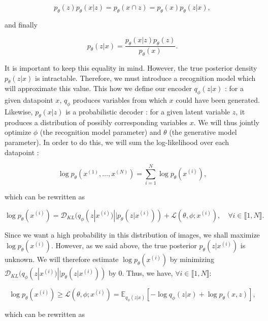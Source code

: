 \documentclass{article}
\begin{document}
\begin{center}
        \[p_\theta(z)p_\theta(x|z) = p_\theta(x \cap z) = p_\theta(x)p_\theta(z|x),\]
\end{center}
and finally
\begin{center}
    \[ p_\theta(z|x) = \frac{p_\theta(x|z)p_\theta (z)}{p_\theta (x)}.\]
\end{center}
It is important to keep this equality in mind. However, the true posterior density $p_\theta(z|x)$ is intractable. Therefore, we must introduce a recognition model which will approximate this value. This how we define our encoder $q_\phi(z | x)$ : for a given datapoint $x$, $q_\phi$ produces variables from which $x$ could have been generated. Likewise, $p_\theta(x|z)$ is a probabilistic decoder : for a given latent variable $z$, it produces a distribution of possibly corresponding variables $x$. We will thus jointly optimize $\phi$ (the recognition model parameter) and $\theta$ (the generative model parameter). In order to do this, we will sum the log-likelihood over each datapoint : 
\begin{center}
    \[\log p_\theta(x^{(1)}, \ldots, x^{(N)}) = \sum_{i=1}^{N} \log p_\theta(x^{(i)}),\]
    
\end{center}

which can be rewritten as

\begin{center}
        \[\log p_\theta(x^{(i)}) = \mathcal{D}_{KL}(q_\phi(z | x^{(i)}) || p_\theta(z | x^{(i)})) + \mathcal{L}(\theta, \phi ; x^{(i)}), \quad \forall i \in \llbracket 1, N \rrbracket.\]
\end{center}

Since we want a high probability in this distribution of images, we shall maximize $\log p_\theta(x^{(i)})$. However, as we said above, the true posterior $p_\theta(z | x^{(i)})$ is unknown. We will therefore estimate $\log p_\theta(x^{(i)})$ by minimizing $\mathcal{D}_{KL}(q_\phi(z | x^{(i)}) || p_\theta(z | x^{(i)}))$ by $0$. Thus, we have, $\forall i \in \llbracket 1, N \rrbracket$:

\begin{center}

    \[\log p_\theta(x^{(i)}) \geq \mathcal{L}(\theta, \phi ; x^{(i)}) = \mathbb{E}_{q_\phi(z|x)} [- \log q_\phi(z|x) + \log p_\theta(x,z)],\]

\end{center}

which can be rewritten as
\end{document}
